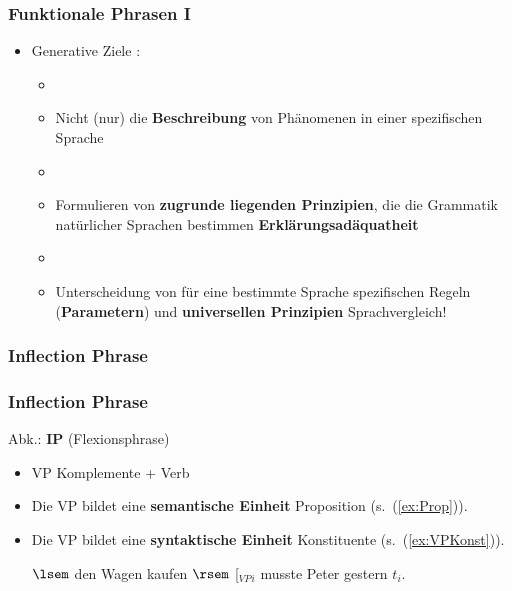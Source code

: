 \begin{frame}
\frametitle{Funktionale Phrasen I}

\begin{itemize}
	\item Generative Ziele \citep[vgl.][]{Haegeman94a}:
	\begin{itemize}
		\item[]
		\item Nicht (nur) die \textbf{Beschreibung} von Phänomenen in einer spezifischen Sprache
		\item[]
		\item Formulieren von \textbf{zugrunde liegenden Prinzipien}, die die Grammatik natürlicher Sprachen bestimmen \ras \textbf{Erklärungsadäquatheit}
		\item[]
		\item Unterscheidung von für eine bestimmte Sprache spezifischen Regeln (\textbf{Parametern}) und \textbf{universellen Prinzipien} \ras Sprachvergleich!
	\end{itemize}
	
\end{itemize}

\end{frame}


\subsubsection{Inflection Phrase}

\begin{frame}
\frametitle{Inflection Phrase}

Abk.: \textbf{IP} (Flexionsphrase)

\begin{itemize}
	\item VP \ras Komplemente + Verb

	\item Die VP bildet eine \textbf{semantische Einheit} \ras Proposition (s.\ (\ref{ex:Prop})).

	\item Die VP bildet eine \textbf{syntaktische Einheit} \ras Konstituente (s.\ (\ref{ex:VPKonst})).

	\eal
	\ex\label{ex:Prop} $\lsem$ den Wagen kaufen $\rsem$
	\ex\label{ex:VPKonst} {[}$_{VP}$\alertred{Den Wagen kaufen}{]}$_{i}$ musste Peter gestern $t_i$. 
	\zl
	
\end{itemize}

\nocite{Fries&MyP16h}

\end{frame}



